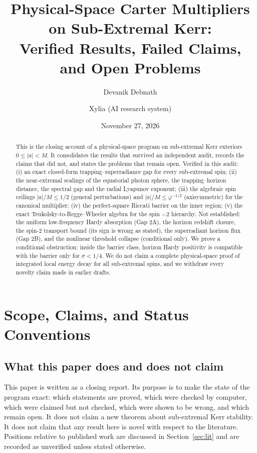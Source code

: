 \documentclass[11pt, a4paper]{article}
\title{\textbf{\color{navy}Physical-Space Carter Multipliers on Sub-Extremal Kerr:\\
Verified Results, Failed Claims, and Open Problems}}
\author{Devanik Debnath \and Xylia (AI research system)}
\date{November 27, 2026}
\theoremstyle{remark}
\theoremstyle{definition}
\begin{document}
\maketitle

\begin{abstract}
This is the closing account of a physical-space program on sub-extremal Kerr exteriors $0 \le |a| < M$. It consolidates the results that survived an independent audit, records the claims that did not, and states the problems that remain open. Verified in this audit: (i) an exact closed-form trapping--superradiance gap for every sub-extremal spin; (ii) the near-extremal scalings of the equatorial photon sphere, the trapping--horizon distance, the spectral gap and the radial Lyapunov exponent; (iii) the algebraic spin ceilings $|a|/M \le 1/2$ (general perturbations) and $|a|/M \le \varphi^{-1/2}$ (axisymmetric) for the canonical multiplier; (iv) the perfect-square Riccati barrier on the inner region; (v) the exact Teukolsky-to-Regge--Wheeler algebra for the spin $-2$ hierarchy. Not established: the uniform low-frequency Hardy absorption (Gap 2A), the horizon redshift closure, the spin-$2$ transport bound (its sign is wrong as stated), the superradiant horizon flux (Gap 2B), and the nonlinear threshold collapse (conditional only). We prove a conditional obstruction: inside the barrier class, horizon Hardy positivity is compatible with the barrier only for $\sigma < 1/4$. We do not claim a complete physical-space proof of integrated local energy decay for all sub-extremal spins, and we withdraw every novelty claim made in earlier drafts.
\end{abstract}

\tableofcontents

\section{Scope, Claims, and Status Conventions}

\subsection{What this paper does and does not claim}

This paper is written as a closing report. Its purpose is to make the state of the program exact: which statements are proved, which were checked by computer, which were claimed but not checked, which were shown to be wrong, and which remain open. It does not claim a new theorem about sub-extremal Kerr stability. It does not claim that any result here is novel with respect to the literature. Positions relative to published work are discussed in Section~\ref{sec:lit} and are recorded as unverified unless stated otherwise.
\end{document}
